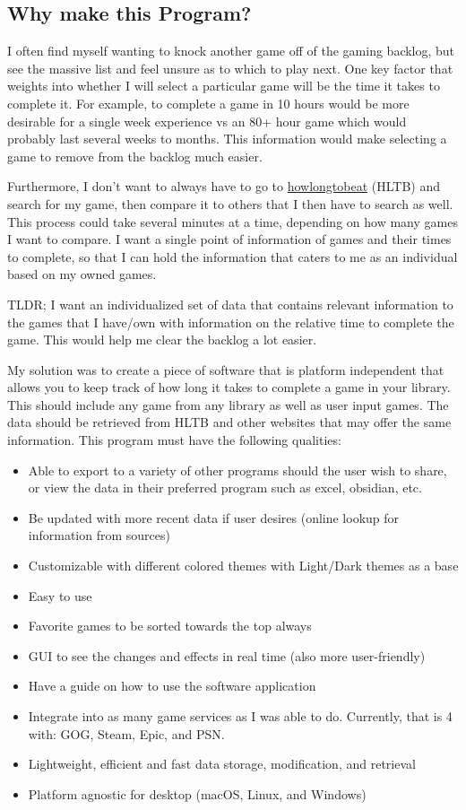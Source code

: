 \documentclass[letterpaper,12pt]{article}
\begin{document}
\subsection{Why make this Program?}

I often find myself wanting to knock another game off of the gaming
backlog, but see the massive list and feel unsure as to which to play
next. One key factor that weights into whether I will select a
particular game will be the time it takes to complete it. For
example, to complete a game in 10 hours would be more desirable for a
single week experience vs an 80+ hour game which would probably last
several weeks to months. This information would make selecting a game
to remove from the backlog much easier.

Furthermore, I don't want to always have to go to
\href{https://howlongtobeat.com/}{howlongtobeat} (HLTB) and search for my game,
then compare it to others that I then have to search as well. This
process could take several minutes at a time, depending on how many
games I want to compare. I want a single point of information of
games and their times to complete, so that I can hold the information
that caters to me as an individual based on my owned games.

TLDR;
I want an individualized set of data that contains relevant
information to the games that I have/own with information on the
relative time to complete the game. This would help me clear
the backlog a lot easier.

My solution was to create a piece of software that is platform
independent that allows you to keep track of how long it takes to
complete a game in your library. This should include any game from
any library as well as user input games. The data should be retrieved
from HLTB and other websites that may offer the same information.
This program must have the following qualities:

\begin{itemize}
	\item Able to export to a variety of other programs should the user
		wish to share, or view the data in their preferred program such as
		excel, obsidian, etc.
	\item Be updated with more recent data if user desires (online
		lookup for information from sources)
	\item Customizable with different colored themes with Light/Dark
		themes as a base
	\item Easy to use
	\item Favorite games to be sorted towards the top always
	\item GUI to see the changes and effects in real time (also more
		user-friendly)
	\item Have a guide on how to use the software application
	\item Integrate into as many game services as I was able to do.
		Currently, that is 4 with: GOG, Steam, Epic, and PSN.
	\item Lightweight, efficient and fast data storage, modification, and retrieval
	\item Platform agnostic for desktop (macOS, Linux, and Windows)
\end{itemize}
\end{document}
